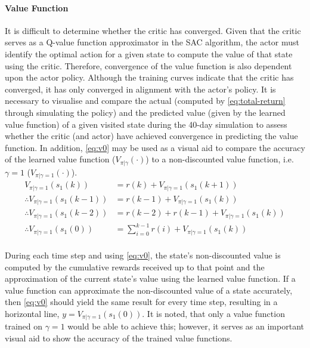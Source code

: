 \paragraph{Value Function}
It is difficult to determine whether the critic has converged. Given that the critic serves as a Q-value function approximator in the SAC algorithm, the actor must identify the optimal action for a given state to compute the value of that state using the critic. Therefore, convergence of the value function is also dependent upon the actor policy. Although the training curves indicate that the critic has converged, it has only converged in alignment with the actor’s policy. It is necessary to visualise and compare the actual (computed by \autoref{eq:total-return} through simulating the policy) and the predicted value (given by the learned value function) of a given visited state during the 40-day simulation to assess whether the critic (and actor) have achieved convergence in predicting the value function. In addition, \autoref{eq:v0} may be used as a visual aid to compare the accuracy of the learned value function ($V_{\pi|\gamma}(\cdot)$) to a non-discounted value function, i.e. $\gamma = 1$ ($V_{\pi|\gamma=1}(\cdot)$).
\begin{equation}\label{eq:v0}
	\begin{aligned}
		V_{\pi|\gamma = 1}(s_1(k)) &= r(k) + V_{\pi|\gamma = 1}(s_1(k+1)) \\
		\therefore V_{\pi|\gamma = 1}(s_1(k-1)) &= r(k-1) + V_{\pi|\gamma = 1}(s_1(k)) \\
		\therefore V_{\pi|\gamma = 1}(s_1 (k-2)) &= r(k-2) + r(k-1) + V_{\pi|\gamma = 1}(s_1(k)) \\
		\therefore V_{\pi|\gamma = 1}(s_1(0)) &= \sum_{i=0}^{k-1} {r(i)} + V_{\pi|\gamma = 1}(s_1(k))   \\
	\end{aligned}
\end{equation}

During each time step and using \autoref{eq:v0}, the state’s non-discounted value is computed by the cumulative rewards received up to that point and the approximation of the current state’s value using the learned value function. If a value function can approximate the non-discounted value of a state accurately, then \autoref{eq:v0} should yield the same result for every time step, resulting in a horizontal line, $y = V_{\pi|\gamma = 1}(s_1(0))$. It is noted, that only a value function trained on $\gamma = 1$ would be able to achieve this; however, it serves as an important visual aid to show the accuracy of the trained value functions.

